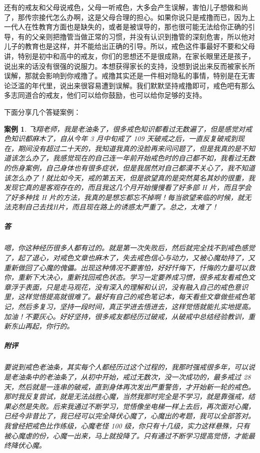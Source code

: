 \documentclass{ctexart}
\newtheorem{case}{案例}
\begin{document}
还有的戒友和父母说戒色，父母一听戒色，大多会产生误解，害怕儿子想做和尚了，那传宗接代怎么办啊，这是父母合理的担心。如果你说只是戒撸而已，因为上一代人在性教育方面也是缺失的，或者是被误导的，那也很可能无法给你正确的引导，有的父亲则把撸管当做正常的习惯，并没有认识到撸管的深刻危害，所以他对儿子的教育也是这样，并不能给出正确的引导。所以，戒色这件事最好不要和父母讲，特别是初中和高中的戒友，你们的思想还不是很成熟，在家长眼里还是孩子，说出来的话没有很强的说服力。本想获得家长的支持，没想到说出来反而被家长所误解，那就会影响到你戒撸了。戒撸其实还是一件相对隐私的事情，特别是在无害论泛滥的年代里，说出来很容易遭到误解。我们默默坚持戒撸即可，戒色吧有那么多志同道合的戒友，他们可以给你鼓励，也可以给你足够的支持。

下面分享几个答疑案例：

\begin{case}
    飞翔老师，我是老油条了，很多戒色知识都看过无数遍了，但是感觉对戒色知识都麻木了，自从今年 3 月中旬戒了 109 天破戒之后，一直反复破戒到现在，期间没有超过二十天的，我知道我真的没脸再来问问题了，但是我真的是不知道该怎么办了，我感觉现在的自己连一年前开始戒色时的自己都不如，我看过无数的伤身案例，自己身体也有很多症状，但是我居然对自己都漠不关心了，我不知道该怎么办了！就比如今天，戒的第五天，但是欲望真的是突然莫名其妙的很重，我发现它真的是客观存在的，而且我这几个月开始慢慢看了好多部 H 片，而且学会了好多种找 H 片的方法，我真的是想忘都忘不掉啊！每当欲望来临的时候，就无法克制自己去找H片，而且现在路上的诱惑太严重了。总之，太难了！
    \subparagraph{答} 嗯，你这种经历很多人都有过的。就是第一次失败后，然后就完全找不到戒色感觉了，起了退心，对戒色文章也麻木了，失去戒色信心与动力，又被心魔劫持了，又重新做回了心魔的傀儡。出现这种情况不要害怕，好好忏悔下，忏悔的力量可以救你，重新下大决心，重新找回戒色状态。学习一定要养成习惯，很多戒友看戒色文章浮于表面，只是走马观花，没有深入的理解和认识，没有融入自己的戒色意识里，这样觉悟提高就很难了。最好有自己的戒色笔记本，每天看些文章做些戒色笔记，然后多复习，坚持一段时间，真正学进去悟进去，这样觉悟就能扎实地提高。加油！不要灰心。好好坚持，很多戒友都经历过破戒，从破戒中总结经验教训，重新东山再起，你行的。
    \subparagraph{附评} 要说到戒色老油条，其实每个人都经历过这个过程的，我那时强戒很多年，可以说是老油条中的老油条了，从初中开始，戒过无数次，没一次成功的，最多戒过 28 天，然后就是一连串的破戒，直到身体再次发出严重警告，才开始新一轮的戒色。那时我反复尝试，就是无法战胜心魔，当然我那时完全是不学习，就是靠强戒，结果必然是失败。后来我通过不断学习，觉悟像坐电梯一样上去后，再次面对心魔，已经今非昔比了，我已经可以完全降伏心魔了，心魔出的考题，我可以全部答对。我曾经把戒色比作练级，心魔老怪 100 级，你只有十几级，实力这样悬殊，只有被心魔虐的份，心魔一出来，马上就投降了。只有通过不断学习提高觉悟，才能最终降伏心魔。


\end{case}
\end{document}
